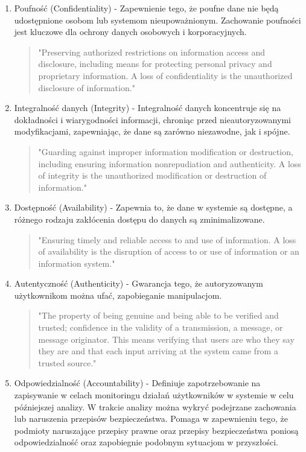 \documentclass[runningheads,12pt]{llncs}
\begin{document}
\begin{enumerate}
    \item Poufność (Confidentiality) - Zapewnienie tego, że poufne dane nie będą udostępnione osobom lub systemom nieupoważnionym. Zachowanie poufności jest kluczowe dla ochrony danych osobowych i korporacyjnych.
    \begin{quote}
        "Preserving authorized restrictions on information access and disclosure, including means for protecting personal privacy and proprietary information. A loss of confidentiality is the unauthorized disclosure of information." ~\cite[p. 22]{stallings2017cryptography}
    \end{quote}
    \item Integralność danych (Integrity) - Integralność danych koncentruje się na dokładności i wiarygodności informacji, chroniąc przed nieautoryzowanymi modyfikacjami, zapewniając, że dane są zarówno niezawodne, jak i spójne.
    \begin{quote}
        "Guarding against improper information modification or destruction, including ensuring information nonrepudiation and authenticity. A loss of integrity is the unauthorized modification or destruction of information." ~\cite[p. 22]{stallings2017cryptography}
    \end{quote}
    \item Dostępność (Availability) - Zapewnia to, że dane w systemie są dostępne, a różnego rodzaju zakłócenia dostępu do danych są zminimalizowane.
    \begin{quote}
        "Ensuring timely and reliable access to and use of information. A loss of availability is the disruption of access to or use of information or an information system." ~\cite[p. 22]{stallings2017cryptography}
    \end{quote}
    \item Autentyczność (Authenticity) - Gwarancja tego, że autoryzowanym użytkownikom można ufać, zapobieganie manipulacjom.
    \begin{quote}
        "The property of being genuine and being able to be verified and trusted; confidence in the validity of a transmission, a message, or message originator. This means verifying that users are who they say they are and that each input arriving at the system came from a trusted source." ~\cite[p. 23]{stallings2017cryptography}
    \end{quote}
    \item Odpowiedzialność (Accountability) - Definiuje zapotrzebowanie na zapisywanie w celach monitoringu działań użytkowników w systemie w celu późniejszej analizy. W trakcie analizy można wykryć podejrzane zachowania lub naruszenia przepisów bezpieczeństwa. Pomaga w zapewnieniu tego, że podmioty naruszające przepisy prawne oraz przepisy bezpieczeństwa poniosą odpowiedzialność oraz zapobiegnie podobnym sytuacjom w przyszłości.

\end{enumerate}
\end{document}
